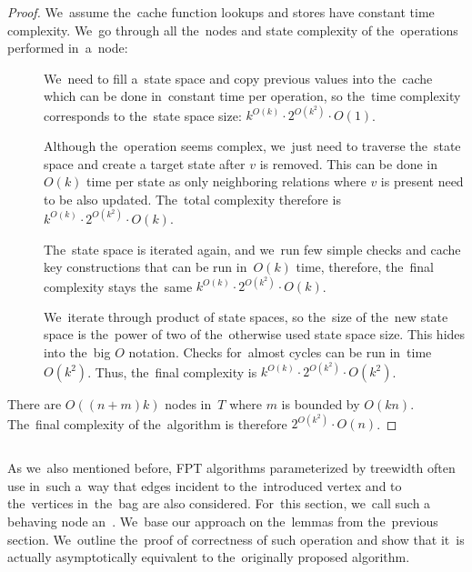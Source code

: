 \begin{proof}
	We~assume the~cache function lookups and stores have constant time complexity.
	We~go through all the~nodes and state complexity of the~operations performed in~a~node:
	\begin{description}
		\item[\IntroduceVertexNode{}]
		      We~need to fill a~state space and copy previous values into the~cache
		      which can be done in~constant time per operation,
		      so the~time complexity corresponds to the~state space size:
		      \( {k}^{O(k)} \cdot 2^{O(k^2)} \cdot O(1) \).
		\item[\ForgetVertexNode{}]
		      Although the~operation seems complex, we~just need to traverse the~state space
		      and create a target state after \( v \) is removed.
		      This can be done in~\( O(k) \) time
		      per state as only neighboring relations where \( v \) is present
		      need to be also updated.
		      The~total complexity therefore is
		      \( {k}^{O(k)} \cdot 2^{O(k^2)} \cdot O(k) \).
		\item[\IntroduceEdgeNode{}]
		      The~state space is iterated again, and we~run few simple checks and cache key constructions
		      that can be run in~\( O(k) \) time, therefore, the~final complexity stays the~same
		      \( {k}^{O(k)} \cdot 2^{O(k^2)} \cdot O(k) \).
		\item[\JoinNode{}]
		      We~iterate through product of state spaces,
		      so the~size of the~new state space is the~power of two
		      of the~otherwise used state space size.
		      This hides into the~big \( O \) notation.
		      Checks for~almost cycles can be run in~time \( O(k^2) \).
		      Thus, the~final complexity is
		      \( {k}^{O(k)} \cdot 2^{O(k^2)} \cdot O(k^2) \).
	\end{description}
	There are \( O((n+m)k) \) nodes in~\( T \) where \( m \) is bounded by \( O(kn) \).
	The~final complexity of the~algorithm is therefore
	\( 2^{O(k^2)} \cdot O(n) \).
\end{proof}
%

\subsection{\IntroduceVertexWithEdgesNode{}}

As we~also mentioned before, FPT algorithms parameterized by treewidth
often use \IntroduceVertexNode{} in~such a~way
that edges incident to the~introduced vertex and to
the~vertices in~the~bag are also considered.
For~this section, we~call such a behaving node an~\IntroduceVertexWithEdgesNode{}.
%
We~base our approach on the~lemmas from the~previous section.
We~outline the~proof of correctness of such operation and show
that it~is actually asymptotically equivalent to the~originally proposed algorithm.

